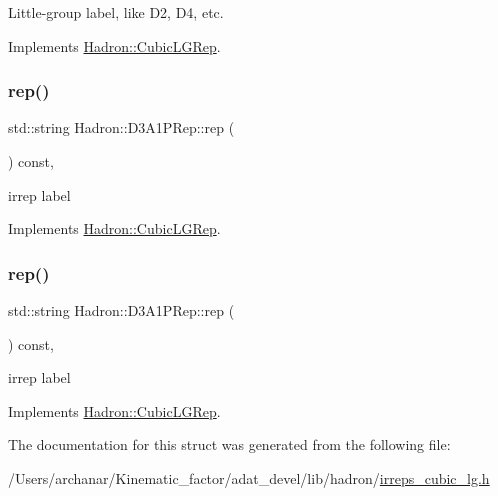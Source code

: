 Little-\/group label, like D2, D4, etc. 

Implements \mbox{\hyperlink{structHadron_1_1CubicLGRep_a9bdb14b519a611d21379ed96a3a9eb41}{Hadron\+::\+Cubic\+L\+G\+Rep}}.

\mbox{\label{structHadron_1_1D3A1PRep_a264020426c9fd4e916cae2cb95f1dc8b}} 
\subsubsection{\texorpdfstring{rep()}{rep()}\hspace{0.1cm}{\footnotesize\ttfamily [1/2]}}
{\footnotesize\ttfamily std\+::string Hadron\+::\+D3\+A1\+P\+Rep\+::rep (\begin{DoxyParamCaption}{ }\end{DoxyParamCaption}) const\hspace{0.3cm}{\ttfamily [inline]}, {\ttfamily [virtual]}}

irrep label 

Implements \mbox{\hyperlink{structHadron_1_1CubicLGRep_a50f5ddbb8f4be4cee0106fa9e8c75e6c}{Hadron\+::\+Cubic\+L\+G\+Rep}}.

\mbox{\label{structHadron_1_1D3A1PRep_a264020426c9fd4e916cae2cb95f1dc8b}} 
\subsubsection{\texorpdfstring{rep()}{rep()}\hspace{0.1cm}{\footnotesize\ttfamily [2/2]}}
{\footnotesize\ttfamily std\+::string Hadron\+::\+D3\+A1\+P\+Rep\+::rep (\begin{DoxyParamCaption}{ }\end{DoxyParamCaption}) const\hspace{0.3cm}{\ttfamily [inline]}, {\ttfamily [virtual]}}

irrep label 

Implements \mbox{\hyperlink{structHadron_1_1CubicLGRep_a50f5ddbb8f4be4cee0106fa9e8c75e6c}{Hadron\+::\+Cubic\+L\+G\+Rep}}.



The documentation for this struct was generated from the following file\+:\begin{DoxyCompactItemize}
\item 
/\+Users/archanar/\+Kinematic\+\_\+factor/adat\+\_\+devel/lib/hadron/\mbox{\hyperlink{lib_2hadron_2irreps__cubic__lg_8h}{irreps\+\_\+cubic\+\_\+lg.\+h}}\end{DoxyCompactItemize}
